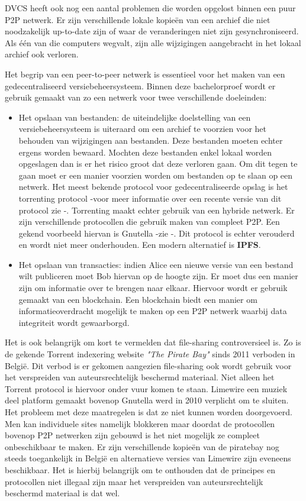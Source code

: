 DVCS heeft ook nog een aantal problemen die worden opgelost binnen een puur P2P netwerk. Er zijn verschillende lokale kopieën van een archief die niet noodzakelijk up-to-date zijn of waar de veranderingen niet zijn gesynchroniseerd. Als één van die computers wegvalt, zijn alle wijzigingen aangebracht in het lokaal archief ook verloren. 

Het begrip van een peer-to-peer netwerk is essentieel voor het maken van een gedecentraliseerd versiebeheersysteem. Binnen deze bachelorproef wordt er gebruik gemaakt van zo een netwerk voor twee verschillende doeleinden:

\begin{itemize}
\item Het opslaan van bestanden: de uiteindelijke doelstelling van een versiebeheersysteem is uiteraard om een archief te voorzien voor het behouden van wijzigingen aan bestanden. Deze bestanden moeten echter ergens worden bewaard. Mochten deze bestanden enkel lokaal worden opgeslagen dan is er het risico groot dat deze verloren gaan. Om dit tegen te gaan moet er een manier voorzien worden om bestanden op te slaan op een netwerk. Het meest bekende protocol voor gedecentraliseerde opslag is het torrenting protocol -voor meer informatie over een recente versie van dit protocol zie \autocite{Cohen2008}-. Torrenting maakt echter gebruik van een hybride netwerk. Er zijn verschillende protocollen die gebruik maken van compleet P2P. Een gekend voorbeeld hiervan is Gnutella -zie \autocite{Klingberg2002}-. Dit protocol is echter verouderd en wordt niet meer onderhouden. Een modern alternatief is \textbf{IPFS}.\\

\item Het opslaan van transacties: indien Alice een nieuwe versie van een bestand wilt publiceren moet Bob hiervan op de hoogte zijn. Er moet dus een manier zijn om informatie over te brengen naar elkaar. Hiervoor wordt er gebruik gemaakt van een blockchain. Een blockchain biedt een manier om informatieoverdracht mogelijk te maken op een P2P netwerk waarbij data integriteit wordt gewaarborgd. 
\end{itemize}

Het is ook belangrijk om kort te vermelden dat file-sharing controversieel is. Zo is de gekende Torrent indexering website \textit{"The Pirate Bay"} sinds 2011 verboden in België. Dit verbod is er gekomen aangezien file-sharing ook wordt gebruik voor het verspreiden van auteursrechtelijk beschermd materiaal. Niet alleen het Torrent protocol is hiervoor onder vuur komen te staan. Limewire een muziek deel platform gemaakt bovenop Gnutella werd in 2010 verplicht om te sluiten. Het probleem met deze maatregelen is dat ze niet kunnen worden doorgevoerd. Men kan individuele sites namelijk  blokkeren maar doordat de protocollen bovenop P2P netwerken zijn gebouwd is het niet mogelijk ze compleet onbeschikbaar te maken. Er zijn verschillende kopieën van de piratebay nog steeds toegankelijk in België en alternatieve versies van Limewire zijn eveneens beschikbaar. Het is hierbij belangrijk om te onthouden dat de principes en protocollen niet illegaal zijn maar het verspreiden van auteursrechtelijk beschermd materiaal is dat wel.\\

